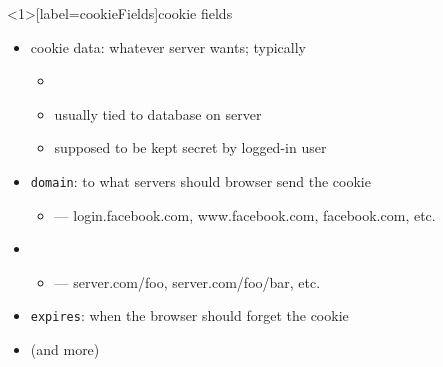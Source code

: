 \begin{frame}<1>[label=cookieFields]{cookie fields}
    \begin{itemize}
        \item cookie data: whatever server wants; typically 
        \begin{itemize}
            \item {}
            \item usually tied to database on server
            \item supposed to be kept secret by logged-in user
        \end{itemize}
    \item \texttt{domain}: to what servers should browser send the cookie
        \begin{itemize}
            \item {} --- login.facebook.com, www.facebook.com, facebook.com, etc.
        \end{itemize}
    \item {}
        \begin{itemize}
            \item {} --- server.com/foo, server.com/foo/bar, etc.
        \end{itemize}
    \item \texttt{expires}: when the browser should forget the cookie
    \item (and more)
    \end{itemize}
\end{frame}


